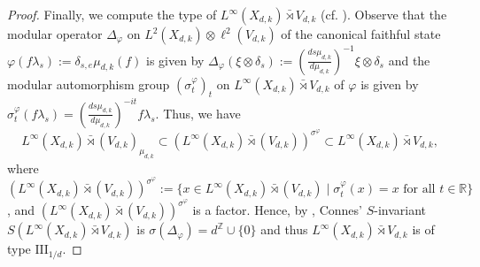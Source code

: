 \documentclass{amsart}
\theoremstyle{remark}
\theoremstyle{definition}
\begin{document}
\begin{proof}
Finally, we compute the type of $L^{\infty} (X_{d, k}) \bar{\rtimes} V_{d, k}$ (cf. \cite[Proposition 2.7]{Morando}).
Observe that the modular operator $\Delta_\varphi$ on $L^2 (X_{d, k}) \otimes \ell^2 (V_{d, k})$ of the canonical faithful state $\varphi (f \lambda _s) := \delta _{s, e} \mu_{d, k} (f)$ is given by $\displaystyle \Delta_\varphi (\xi \otimes \delta _s) := \left( \frac{ds \mu_{d, k}}{d \mu_{d, k}} \right)^{-1} \xi \otimes \delta _s$ and the modular automorphism group $(\sigma _t^{\varphi})_t$ on $L^{\infty}(X_{d, k}) \bar{\rtimes} V_{d, k}$ of $\varphi$ is given by $\displaystyle \sigma _t^{\varphi}(f \lambda_s) = \left( \frac{ds\mu_{d, k}}{d\mu_{d, k}} \right)^{-it} f \lambda _s$. 
Thus, we have 
\[
L^{\infty} (X_{d, k}) \bar{\rtimes} (V_{d, k})_{\mu _{d, k}} \subset (L^{\infty} (X_{d, k}) \bar{\rtimes} (V_{d, k}))^{\sigma ^\varphi} \subset L^{\infty} (X_{d, k}) \bar{\rtimes} V_{d, k},
\]
where $(L^{\infty} (X_{d, k}) \bar{\rtimes} (V_{d, k}))^{\sigma ^\varphi} := \{ x \in L^{\infty} (X_{d, k}) \bar{\rtimes} (V_{d, k}) \mid \sigma_t^{\varphi}(x) = x \text{ for all } t \in \mathbb{R} \}$, and $(L^{\infty} (X_{d, k}) \bar{\rtimes} (V_{d, k}))^{\sigma ^\varphi}$ is a factor.
Hence, by \cite[Corollary 3.2.7]{ConnesSinv}, Connes' $S$-invariant $S(L^{\infty} (X_{d, k}) \bar{\rtimes} V_{d, k})$ is $\sigma (\Delta _\varphi) = d^{\mathbb{Z}} \cup \{ 0 \}$ and thus $L^{\infty} (X_{d, k}) \bar{\rtimes} V_{d, k}$ is of type $\mathrm{III}_{1/d}$.
\end{proof}
\end{document}
